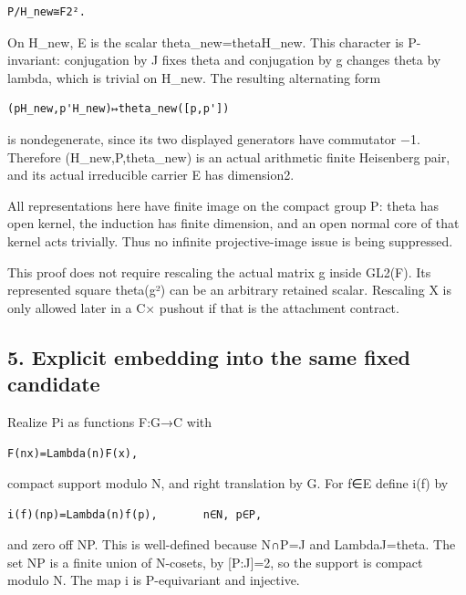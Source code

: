 \begin{Verbatim}[fontsize=\small,breaklines=true,breakanywhere=true]
P/H_new≅F2².
\end{Verbatim}

On H\_new, E is the scalar theta\_new=theta\textbar H\_new. This
character is P-invariant: conjugation by J fixes theta and conjugation
by g changes theta by lambda, which is trivial on H\_new. The resulting
alternating form

\begin{Verbatim}[fontsize=\small,breaklines=true,breakanywhere=true]
(pH_new,p'H_new)↦theta_new([p,p'])
\end{Verbatim}

is nondegenerate, since its two displayed generators have commutator −1.
Therefore (H\_new,P,theta\_new) is an actual arithmetic finite
Heisenberg pair, and its actual irreducible carrier E has dimension2.

All representations here have finite image on the compact group P: theta
has open kernel, the induction has finite dimension, and an open normal
core of that kernel acts trivially. Thus no infinite projective-image
issue is being suppressed.

This proof does not require rescaling the actual matrix g inside GL2(F).
Its represented square theta(g²) can be an arbitrary retained scalar.
Rescaling X is only allowed later in a C× pushout if that is the
attachment contract.

\hypertarget{rank2-explicit-embedding-into-the-same-fixed-candidate}{%
\subsection{5. Explicit embedding into the same fixed
candidate}\label{rank2-explicit-embedding-into-the-same-fixed-candidate}}

Realize Pi as functions F:G→C with

\begin{Verbatim}[fontsize=\small,breaklines=true,breakanywhere=true]
F(nx)=Lambda(n)F(x),
\end{Verbatim}

compact support modulo N, and right translation by G. For f∈E define
i(f) by

\begin{Verbatim}[fontsize=\small,breaklines=true,breakanywhere=true]
i(f)(np)=Lambda(n)f(p),       n∈N, p∈P,
\end{Verbatim}

and zero off NP. This is well-defined because N∩P=J and
Lambda\textbar J=theta. The set NP is a finite union of N-cosets, by
{[}P:J{]}=2, so the support is compact modulo N. The map i is
P-equivariant and injective.

